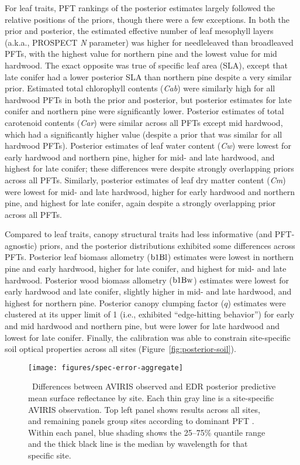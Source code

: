 For leaf traits, PFT rankings of the posterior estimates largely followed the relative positions of the priors, though there were a few exceptions.
In both the prior and posterior, the estimated effective number of leaf mesophyll layers (a.k.a., PROSPECT \emph{N} parameter) was higher for needleleaved than broadleaved PFTs, with the highest value for northern pine and the lowest value for mid hardwood.
The exact opposite was true of specific leaf area (SLA), except that late conifer had a lower posterior SLA than northern pine despite a very similar prior.
Estimated total chlorophyll contents (\emph{Cab}) were similarly high for all hardwood PFTs in both the prior and posterior,
but posterior estimates for late conifer and northern pine were significantly lower.
Posterior estimates of total carotenoid contents (\emph{Car}) were similar across all PFTs except mid hardwood, which had a significantly higher value (despite a prior that was similar for all hardwood PFTs).
Posterior estimates of leaf water content (\emph{Cw}) were lowest for early hardwood and northern pine, higher for mid- and late hardwood, and highest for late conifer; these differences were despite strongly overlapping priors across all PFTs.
Similarly, posterior estimates of leaf dry matter content (\emph{Cm}) were lowest for mid- and late hardwood, higher for early hardwood and northern pine, and highest for late conifer, again despite a strongly overlapping prior across all PFTs.

Compared to leaf traits, canopy structural traits had less informative (and PFT-agnostic) priors, and the posterior distributions exhibited some differences across PFTs.
Posterior leaf biomass allometry ($\mathrm{b1Bl}$) estimates were lowest in northern pine and early hardwood, higher for late conifer, and highest for mid- and late hardwood.
Posterior wood biomass allometry ($\mathrm{b1Bw}$) estimates were lowest for early hardwood and late conifer, slightly higher in mid- and late hardwood, and highest for northern pine.
Posterior canopy clumping factor ($q$) estimates were clustered at its upper limit of 1 (i.e., exhibited ``edge-hitting behavior'') for early and mid hardwood and northern pine, but were lower for late hardwood and lowest for late conifer.
Finally, the calibration was able to constrain site-specific soil optical properties across all sites (Figure~\ref{fig:posterior-soil}).

\begin{figure}
  \centering
  \texttt{[image: figures/spec-error-aggregate]}
  \caption{\label{fig:spec-error-aggregate}\
    Differences between AVIRIS observed and EDR posterior predictive mean surface reflectance by site.
    Each thin gray line is a site-specific AVIRIS observation.
    Top left panel shows results across all sites,
    and remaining panels group sites according to dominant PFT .
    Within each panel, blue shading shows the 25--75\% quantile range and the thick black line is the median by wavelength for that specific site.
  }
\end{figure}

